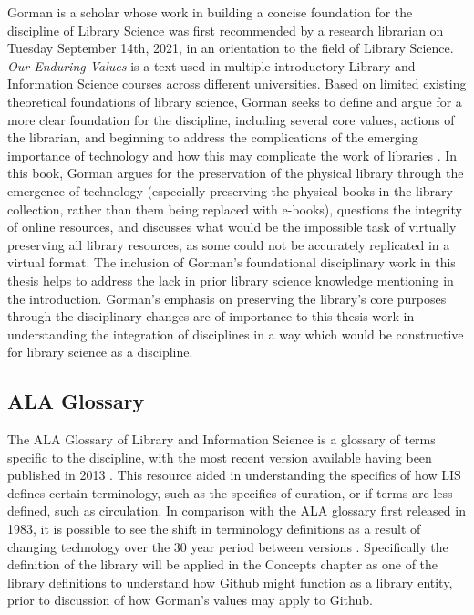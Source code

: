 Gorman is a scholar whose work in building a concise foundation for the discipline of Library Science was first recommended by a research librarian on Tuesday September 14th, 2021, in an orientation to the field of Library Science. \textit{Our Enduring Values} is a text used in multiple introductory Library and Information Science courses across different universities. Based on limited existing theoretical foundations of library science, Gorman seeks to define and argue for a more clear foundation for the discipline, including several core values, actions of the librarian, and beginning to address the complications of the emerging importance of technology and how this may complicate the work of libraries \cite{gorman2000values}. In this book, Gorman argues for the preservation of the physical library through the emergence of technology (especially preserving the physical books in the library collection, rather than them being replaced with e-books), questions the integrity of online resources, and discusses what would be the impossible task of virtually preserving all library resources, as some could not be accurately replicated in a virtual format. The inclusion of Gorman's foundational disciplinary work in this thesis helps to address the lack in prior library science knowledge mentioning in the introduction. Gorman's emphasis on preserving the library's core purposes through the disciplinary changes are of importance to this thesis work in understanding the integration of disciplines in a way which would be constructive for library science as a discipline. 

\subsection{ALA Glossary}

The ALA Glossary of Library and Information Science is a glossary of terms specific to the discipline, with the most recent version available having been published in 2013 \cite{glossary2013}. This resource aided in  understanding the specifics of how LIS defines certain terminology, such as the specifics of curation, or if terms are less defined, such as circulation. In comparison with the ALA glossary first released in 1983, it is possible to see the shift in terminology definitions as a result of changing technology over the 30 year period between versions \cite{glossary1983}. Specifically the definition of the library will be applied in the Concepts chapter as one of the library definitions to understand how Github might function as a library entity, prior to discussion of how Gorman's values may apply to Github. 

